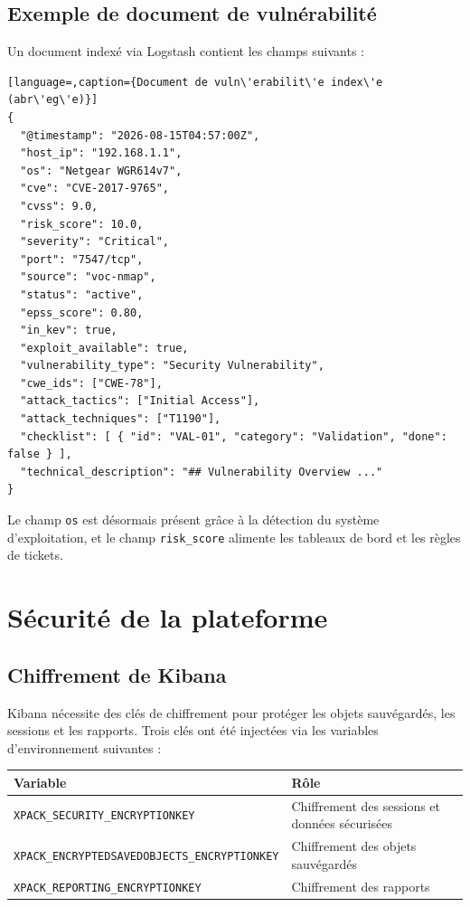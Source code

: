 \documentclass[11pt,a4paper]{article}
\begin{document}
\subsection{Exemple de document de vuln\'erabilit\'e}

Un document index\'e via Logstash contient les champs suivants :

\begin{lstlisting}[language=,caption={Document de vuln\'erabilit\'e index\'e (abr\'eg\'e)}]
{
  "@timestamp": "2026-08-15T04:57:00Z",
  "host_ip": "192.168.1.1",
  "os": "Netgear WGR614v7",
  "cve": "CVE-2017-9765",
  "cvss": 9.0,
  "risk_score": 10.0,
  "severity": "Critical",
  "port": "7547/tcp",
  "source": "voc-nmap",
  "status": "active",
  "epss_score": 0.80,
  "in_kev": true,
  "exploit_available": true,
  "vulnerability_type": "Security Vulnerability",
  "cwe_ids": ["CWE-78"],
  "attack_tactics": ["Initial Access"],
  "attack_techniques": ["T1190"],
  "checklist": [ { "id": "VAL-01", "category": "Validation", "done": false } ],
  "technical_description": "## Vulnerability Overview ..."
}
\end{lstlisting}

Le champ \texttt{os} est d\'esormais pr\'esent gr\^ace \`a la d\'etection du
syst\`eme d'exploitation, et le champ \texttt{risk\_score} alimente les
tableaux de bord et les r\`egles de tickets.

\clearpage

\section{S\'ecurit\'e de la plateforme}

\subsection{Chiffrement de Kibana}

Kibana n\'ecessite des cl\'es de chiffrement pour prot\'eger les objets
sauv\'egard\'es, les sessions et les rapports. Trois cl\'es ont \'et\'e
inject\'ees via les variables d'environnement suivantes :

\begin{center}
\small
\begin{tabularx}{\linewidth}{@{}l X@{}}
\toprule
\textbf{Variable} & \textbf{R\^ole} \\
\midrule
\texttt{XPACK\_SECURITY\_ENCRYPTIONKEY} & Chiffrement des sessions et donn\'ees s\'ecuris\'ees \\
\texttt{XPACK\_ENCRYPTEDSAVEDOBJECTS\_ENCRYPTIONKEY} & Chiffrement des objets sauv\'egard\'es \\
\texttt{XPACK\_REPORTING\_ENCRYPTIONKEY} & Chiffrement des rapports \\
\bottomrule
\end{tabularx}
\end{center}
\end{document}
